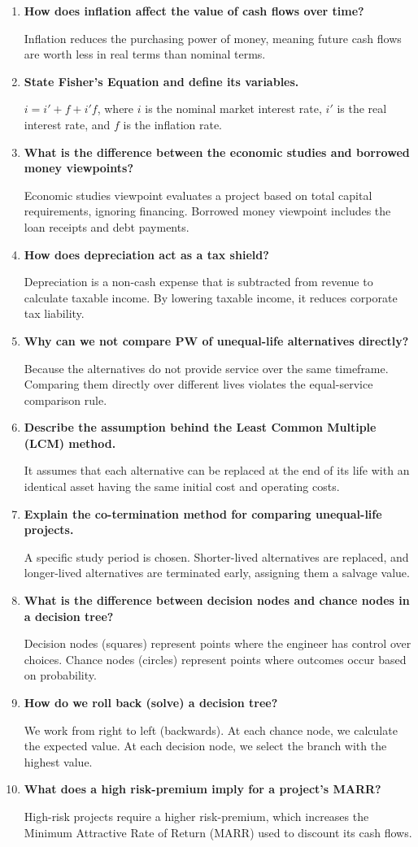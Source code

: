 \documentclass[12pt,a4paper]{article}
\newcommand{\Q}[1]{\textbf{#1}\par\noindent\ignorespaces}
\begin{document}
\begin{tcolorbox}[exambox, title={\textbf{Frequently Asked / Viva Questions}}]
\begin{enumerate}[topsep=0pt, label=\textbf{Q\arabic*.}, itemsep=5pt]
  \item \Q{How does inflation affect the value of cash flows over time?}
    Inflation reduces the purchasing power of money, meaning future cash flows are worth less in real terms than nominal terms.
  \item \Q{State Fisher's Equation and define its variables.}
    $i = i' + f + i'f$, where $i$ is the nominal market interest rate, $i'$ is the real interest rate, and $f$ is the inflation rate.
  \item \Q{What is the difference between the economic studies and borrowed money viewpoints?}
    Economic studies viewpoint evaluates a project based on total capital requirements, ignoring financing. Borrowed money viewpoint includes the loan receipts and debt payments.
  \item \Q{How does depreciation act as a tax shield?}
    Depreciation is a non-cash expense that is subtracted from revenue to calculate taxable income. By lowering taxable income, it reduces corporate tax liability.
  \item \Q{Why can we not compare PW of unequal-life alternatives directly?}
    Because the alternatives do not provide service over the same timeframe. Comparing them directly over different lives violates the equal-service comparison rule.
  \item \Q{Describe the assumption behind the Least Common Multiple (LCM) method.}
    It assumes that each alternative can be replaced at the end of its life with an identical asset having the same initial cost and operating costs.
  \item \Q{Explain the co-termination method for comparing unequal-life projects.}
    A specific study period is chosen. Shorter-lived alternatives are replaced, and longer-lived alternatives are terminated early, assigning them a salvage value.
  \item \Q{What is the difference between decision nodes and chance nodes in a decision tree?}
    Decision nodes (squares) represent points where the engineer has control over choices. Chance nodes (circles) represent points where outcomes occur based on probability.
  \item \Q{How do we roll back (solve) a decision tree?}
    We work from right to left (backwards). At each chance node, we calculate the expected value. At each decision node, we select the branch with the highest value.
  \item \Q{What does a high risk-premium imply for a project's MARR?}
    High-risk projects require a higher risk-premium, which increases the Minimum Attractive Rate of Return (MARR) used to discount its cash flows.


\end{enumerate}
\end{tcolorbox}
\end{document}
